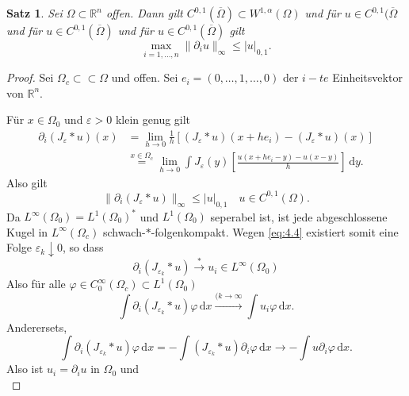 \documentclass[
paper=a4,
bibtotocnumbered,
liststotocnumbered,
tablecaptionabove,
pointlessnumbers,
twoside,
openright,
10pt
]
{report}
\let\phi\varphi
\newtheorem{satz}[thm]{Satz}
\theoremstyle{definition}
\numberwithin{equation}{chapter}
\begin{document}
\begin{satz}
 Sei $\Omega\subset \mathbb R^n$ offen. Dann gilt $C^{0,1}(\overline{\Omega})\subset W^{1,\alpha}(\Omega)$ und für $u\in C^{0,1}(\overline{\Omega}$ und für $u\in C^{0,1}(\overline{\Omega})$ und für $u\in C^{0,1}(\overline{\Omega})$ gilt
 \begin{equation}
  \max_{i=1,\ldots, n} \| \partial_i u\|_\infty\le |u|_{0,1}.
 \end{equation}
\end{satz}

\begin{proof}
 Sei $\Omega_c \subset \subset \Omega$ und offen. Sei $e_i = (0,\ldots, 1, \ldots, 0)$ der $i-te$ Einheitsvektor von $\mathbb R^n$.
 
 Für $x\in \Omega_0$ und $\varepsilon >0$ klein genug gilt
 \begin{align*}
  \partial_i(J_\varepsilon * u) (x)&= \lim_{h\to 0} \frac{1}{h} \left [ (J_\varepsilon * u) (x+he_i) - (J_\varepsilon*u) (x)\right ] \\
  &\stackrel{x\in \Omega_c}=\lim_{h\to 0} \int J_{\varepsilon}(y) \left [ \frac{u(x+he_i -y) - u(x-y)}{h} \right ]\, \mathrm dy.
 \end{align*}
 Also gilt
 \begin{equation}\label{eq:4.4}
  \|\partial_i (J_\varepsilon * u) \|_\infty \le |u|_{0,1} \quad u\in C^{0,1}(\Omega).
 \end{equation}
 Da $L^\infty(\Omega_0) = L^1(\Omega_0)^*$ und $L^1(\Omega_0)$ seperabel ist, ist jede abgeschlossene Kugel in $L^\infty(\Omega_c)$ schwach-$*$-folgenkompakt. Wegen \eqref{eq:4.4} existiert somit eine Folge $\varepsilon_k \downarrow 0$, so dass 
 \begin{equation}
  \partial_i (J_{\varepsilon_k} * u) \stackrel{*}{\to} u_i \in L^\infty(\Omega_0)
 \end{equation}
 Also für alle $\phi \in C_0^\infty(\Omega_c) \subset L^1(\Omega_0)$
 \begin{equation}
  \int \partial_i (J_{\varepsilon_k} *u) \phi \, \mathrm dx \stackrel{(k\to \infty}{\to} \int u_i \phi \, \mathrm dx.
 \end{equation}
 Anderersets,
 \begin{equation}
  \int \partial_i (J_{\varepsilon_k} * u) \phi \, \mathrm dx = - \int (J_{\varepsilon_k} * u) \partial_i \phi \, \mathrm dx \to - \int u\partial_i \phi \, \mathrm dx.
 \end{equation}
Also ist $u_i = \partial_i u$ in $\Omega_0$ und 
\begin{equation}\label{eq:4.5}

\end{equation}
\end{proof}
\end{document}
